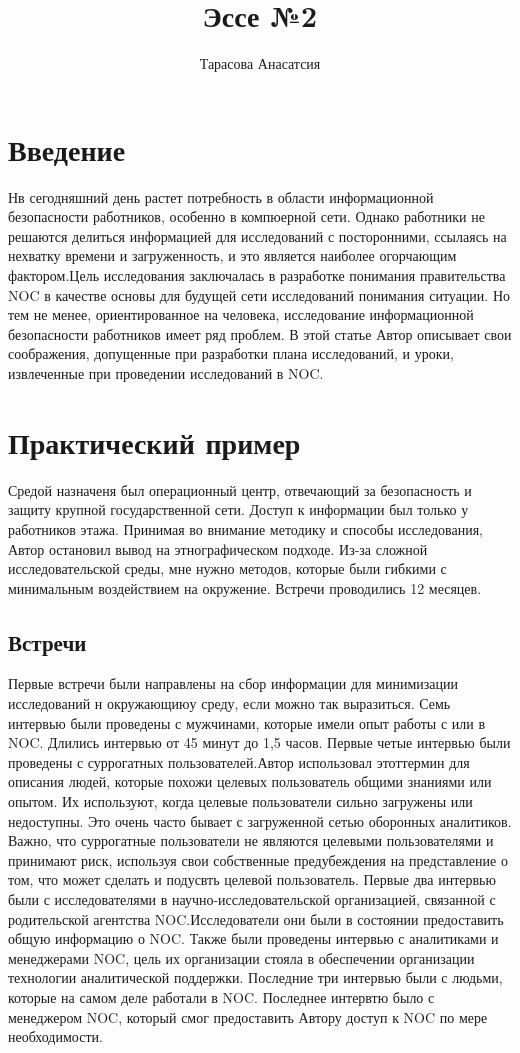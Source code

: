 \documentclass[12pt,]{article}
\author{Тарасова Анасатсия}
\title{Эссе №2}
\begin{document}
\maketitle
\section{Введение}
Нв сегодняшний день растет потребность в  области информационной безопасности работников, особенно в компюерной сети. Однако работники не решаются делиться информацией для исследований с посторонними, ссылаясь на нехватку времени и загруженность, и это является наиболее огорчающим фактором.Цель исследования заключалась в разработке понимания правительства NOC в качестве основы для будущей сети исследований понимания ситуации. Но тем не менее, ориентированное на человека, исследование информационной безопасности работников имеет ряд проблем. В этой статье Автор описывает свои соображения, допущенные при разработки плана исследований, и уроки, извлеченные при проведении исследований в NOC.
\section{Практический пример}
Средой назначеня был операционный центр, отвечающий за безопасность и защиту крупной государственной сети. Доступ к информации был только у работников этажа. Принимая во внимание методику и способы исследования, Автор остановил вывод на этнографическом подходе. Из-за сложной исследовательской среды, мне нужно методов, которые были гибкими с минимальным воздействием на окружение. Встречи проводились 12 месяцев. 
\subsection{Встречи}
Первые встречи были направлены на сбор информации для минимизации исследований н окружающиюу среду, если можно так выразиться. Семь интервью были проведены с мужчинами, которые имели опыт работы с или в NOC. Длились интервью от 45 минут до 1,5 часов. Первые четые интервью были проведены с суррогатных пользователей.Автор использовал этоттермин для описания людей, которые похожи целевых пользователь общими знаниями или опытом. Их используют, когда целевые пользователи сильно загружены или недоступны. Это очень часто бывает с загруженной сетью оборонных аналитиков. Важно, что суррогатные пользователи не являются целевыми пользователями и принимают риск, используя свои собственные предубеждения на представление о том, что может сделать и подусвть целевой пользователь. Первые два интервью были с исследователями в научно-исследовательской организацией, связанной с родительской агентства NOC.Исследователи они были в состоянии предоставить общую информацию о NOC. Также были проведены интервью с аналитиками и менеджерами NOC, цель их организации стояла в обеспечении организации технологии аналитической поддержки. Последние три интервью были с людьми, которые на самом деле работали в  NOC. Последнее интервтю было с менеджером NOC, который смог предоставить Автору доступ к NOC по мере необходимости.
\end{document}
